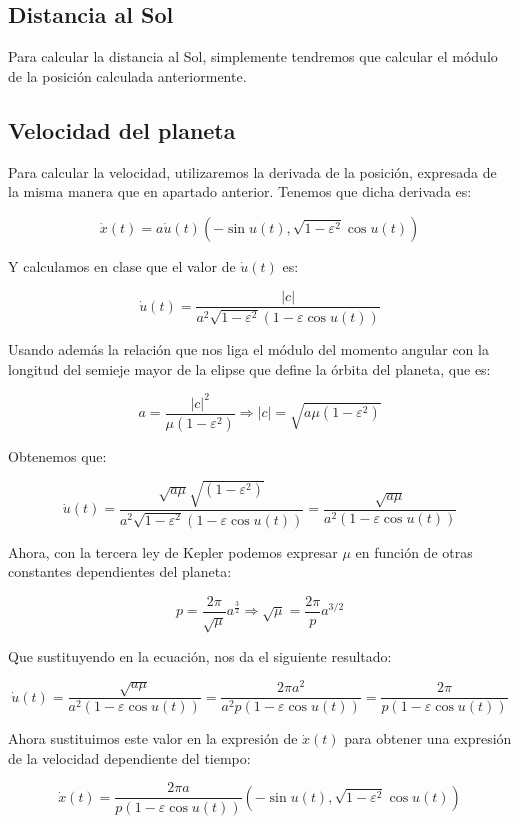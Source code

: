 \documentclass[12pt]{article}
\begin{document}
\subsection{Distancia al Sol}

Para calcular la distancia al Sol, simplemente tendremos que calcular
el módulo de la posición calculada anteriormente.

\subsection{Velocidad del planeta}

Para calcular la velocidad, utilizaremos la derivada de la posición,
expresada de la misma manera que en apartado anterior. Tenemos que
dicha derivada es:

\[
\dot{x}(t) = a \dot{u}(t)(-\sin{u(t)}, \sqrt{1 -
  \varepsilon^2}\cos{u(t)})
\]

Y calculamos en clase que el valor de $\dot{u}(t)$ es:

\[
\dot{u}(t) = \frac{|c|}{a^2 \sqrt{1 - \varepsilon^2}(1 - \varepsilon
  \cos{u(t)})}
\]

Usando además la relación que nos liga el módulo del momento angular
con la longitud del semieje mayor de la elipse que define la órbita
del planeta, que es:

\[
a = \frac{|c|^2}{\mu(1 - \varepsilon^2)} \Rightarrow |c| =
\sqrt{a\mu(1 - \varepsilon^2)}
\]

Obtenemos que:

\[
\dot{u}(t) = \frac{\sqrt{a\mu}\sqrt{(1 - \varepsilon^2)}}{a^2 \sqrt{1
    - \varepsilon^2}(1 - \varepsilon \cos{u(t)})} =
\frac{\sqrt{a\mu}}{a^2 (1 - \varepsilon \cos{u(t)})}
\]

Ahora, con la tercera ley de Kepler podemos expresar $\mu$ en función
de otras constantes dependientes del planeta:

\[
p = \frac{2\pi}{\sqrt{\mu}}a^{\frac{3}{2}} \Rightarrow \sqrt{\mu} =
\frac{2\pi}{p}a^{3/2}
\]

Que sustituyendo en la ecuación, nos da el siguiente resultado:

\[
\dot{u}(t) = \frac{\sqrt{a\mu}}{a^2 (1 - \varepsilon \cos{u(t)})} =
\frac{2 \pi a^2}{a^2 p (1 - \varepsilon \cos{u(t)})} = \frac{2 \pi} {p
  (1 - \varepsilon \cos{u(t)})}
\]

Ahora sustituimos este valor en la expresión de $\dot{x}(t)$ para
obtener una expresión de la velocidad dependiente del tiempo:

\[
\dot{x}(t) = \frac{2 \pi a}{p(1 - \varepsilon
  \cos{u(t)})}(-\sin{u(t)}, \sqrt{1 - \varepsilon^2}\cos{u(t)})
\]
\end{document}
